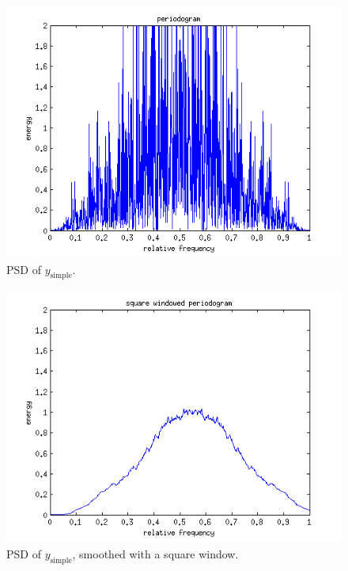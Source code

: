\documentclass[10pt]{article}
\begin{document}
\begin{figure}[!hp]
    \begin{center}
      \includegraphics[width=1\textwidth]{simple_periodogram}
    \caption{PSD of $y_\text{simple}$. \label{fig:TheoACFsimple}}
    \end{center}
\end{figure}

\begin{figure}[!hp]
    \begin{center}
      \includegraphics[width=1\textwidth]{simple_periodogram_square}
    \caption{PSD of $y_\text{simple}$, smoothed with a square window. \label{fig:TheoACFsimple}}
    \end{center}
\end{figure}
\end{document}
